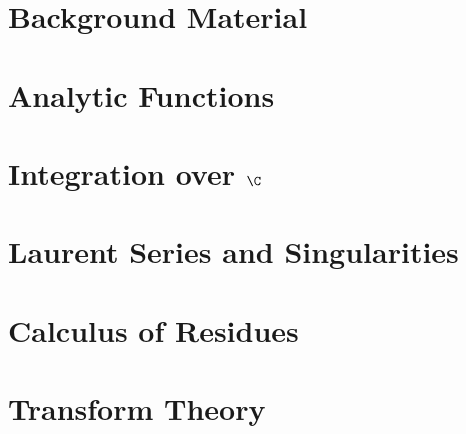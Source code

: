\documentclass[british,11pt,a4paper]{report}
\begin{document}
\maketitle
\tableofcontents

\chapter{Background Material}

\chapter{Analytic Functions}

\chapter{Integration over \texorpdfstring{$\C$}{C}}

\chapter{Laurent Series and Singularities}

\chapter{Calculus of Residues}

\chapter{Transform Theory}
%
\end{document}
